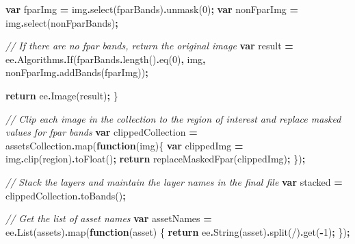 \documentclass[
  10pt,
  b5paper,
  oneside]{book}
\newenvironment{Shaded}{\begin{snugshade}}{\end{snugshade}}
\newcommand{\AttributeTok}[1]{\textcolor[rgb]{0.77,0.63,0.00}{#1}}
\newcommand{\CommentTok}[1]{\textcolor[rgb]{0.56,0.35,0.01}{\textit{#1}}}
\newcommand{\ControlFlowTok}[1]{\textcolor[rgb]{0.13,0.29,0.53}{\textbf{#1}}}
\newcommand{\DecValTok}[1]{\textcolor[rgb]{0.00,0.00,0.81}{#1}}
\newcommand{\FunctionTok}[1]{\textcolor[rgb]{0.00,0.00,0.00}{#1}}
\newcommand{\KeywordTok}[1]{\textcolor[rgb]{0.13,0.29,0.53}{\textbf{#1}}}
\newcommand{\NormalTok}[1]{#1}
\newcommand{\OperatorTok}[1]{\textcolor[rgb]{0.81,0.36,0.00}{\textbf{#1}}}
\newcommand{\StringTok}[1]{\textcolor[rgb]{0.31,0.60,0.02}{#1}}
\begin{document}
\begin{Shaded}
\begin{Highlighting}[]
  \KeywordTok{var}\NormalTok{ fparImg }\OperatorTok{=}\NormalTok{ img}\OperatorTok{.}\FunctionTok{select}\NormalTok{(fparBands)}\OperatorTok{.}\FunctionTok{unmask}\NormalTok{(}\DecValTok{0}\NormalTok{)}\OperatorTok{;}
  \KeywordTok{var}\NormalTok{ nonFparImg }\OperatorTok{=}\NormalTok{ img}\OperatorTok{.}\FunctionTok{select}\NormalTok{(nonFparBands)}\OperatorTok{;}
  
  \CommentTok{// If there are no fpar bands, return the original image}
  \KeywordTok{var}\NormalTok{ result }\OperatorTok{=}\NormalTok{ ee}\OperatorTok{.}\AttributeTok{Algorithms}\OperatorTok{.}\FunctionTok{If}\NormalTok{(fparBands}\OperatorTok{.}\FunctionTok{length}\NormalTok{()}\OperatorTok{.}\FunctionTok{eq}\NormalTok{(}\DecValTok{0}\NormalTok{)}\OperatorTok{,}
\NormalTok{                                 img}\OperatorTok{,}
\NormalTok{                                 nonFparImg}\OperatorTok{.}\FunctionTok{addBands}\NormalTok{(fparImg))}\OperatorTok{;}
  
  \ControlFlowTok{return}\NormalTok{ ee}\OperatorTok{.}\FunctionTok{Image}\NormalTok{(result)}\OperatorTok{;}
\NormalTok{\}}

\CommentTok{// Clip each image in the collection to the region of interest and replace masked values for fpar bands}
\KeywordTok{var}\NormalTok{ clippedCollection }\OperatorTok{=}\NormalTok{ assetsCollection}\OperatorTok{.}\FunctionTok{map}\NormalTok{(}\KeywordTok{function}\NormalTok{(img)\{}
  \KeywordTok{var}\NormalTok{ clippedImg }\OperatorTok{=}\NormalTok{ img}\OperatorTok{.}\FunctionTok{clip}\NormalTok{(region)}\OperatorTok{.}\FunctionTok{toFloat}\NormalTok{()}\OperatorTok{;}
  \ControlFlowTok{return} \FunctionTok{replaceMaskedFpar}\NormalTok{(clippedImg)}\OperatorTok{;}
\NormalTok{\})}\OperatorTok{;}

\CommentTok{// Stack the layers and maintain the layer names in the final file}
\KeywordTok{var}\NormalTok{ stacked }\OperatorTok{=}\NormalTok{ clippedCollection}\OperatorTok{.}\FunctionTok{toBands}\NormalTok{()}\OperatorTok{;}

\CommentTok{// Get the list of asset names}
\KeywordTok{var}\NormalTok{ assetNames }\OperatorTok{=}\NormalTok{ ee}\OperatorTok{.}\FunctionTok{List}\NormalTok{(assets)}\OperatorTok{.}\FunctionTok{map}\NormalTok{(}\KeywordTok{function}\NormalTok{(asset) \{}
  \ControlFlowTok{return}\NormalTok{ ee}\OperatorTok{.}\FunctionTok{String}\NormalTok{(asset)}\OperatorTok{.}\FunctionTok{split}\NormalTok{(}\StringTok{\textquotesingle{}/\textquotesingle{}}\NormalTok{)}\OperatorTok{.}\FunctionTok{get}\NormalTok{(}\OperatorTok{{-}}\DecValTok{1}\NormalTok{)}\OperatorTok{;}
\NormalTok{\})}\OperatorTok{;}


\end{Highlighting}
\end{Shaded}
\end{document}
